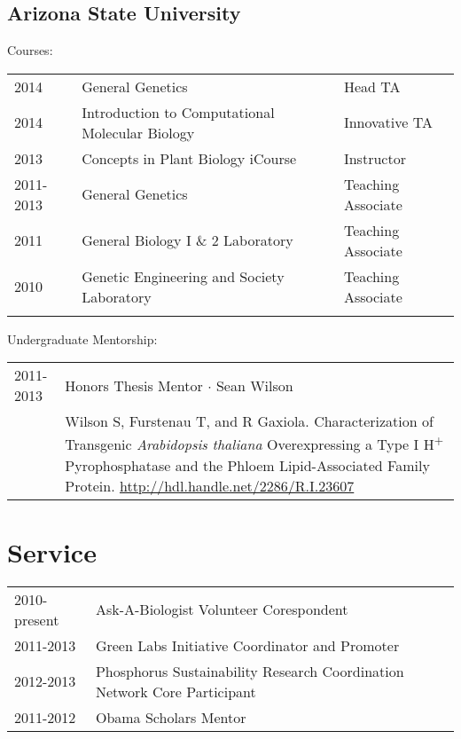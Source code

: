 \documentclass[11pt]{article}
\begin{document}
\subsection*{Arizona State University}
Courses:\\
\begin{tabularx}{\linewidth}{llX}
2014&General Genetics& Head TA\\
2014& Introduction to Computational Molecular Biology& Innovative TA\\
2013&Concepts in Plant Biology iCourse& Instructor\\
2011-2013&General Genetics&Teaching Associate\\
2011&General Biology I \& 2 Laboratory& Teaching Associate\\
2010&Genetic Engineering and Society Laboratory&Teaching Associate\\\\
\end{tabularx}
Undergraduate Mentorship:\\
\begin{tabularx}{\linewidth}{lX}
2011-2013&Honors Thesis Mentor $\cdotp$ Sean Wilson\\
&Wilson S, Furstenau T, and R Gaxiola. Characterization of Transgenic \textit{Arabidopsis thaliana} Overexpressing a Type I H\textsuperscript{+} Pyrophosphatase and the Phloem Lipid-Associated Family Protein. \href{http://hdl.handle.net/2286/R.I.23607}{http://hdl.handle.net/2286/R.I.23607}\\
\end{tabularx}



\section*{Service}
\begin{tabularx}{\linewidth}{lX}
2010-present &Ask-A-Biologist Volunteer Corespondent\\
2011-2013&Green Labs Initiative Coordinator and Promoter\\
2012-2013&Phosphorus Sustainability Research Coordination Network Core Participant\\
2011-2012&Obama Scholars Mentor\\
\end{tabularx}
\end{document}
